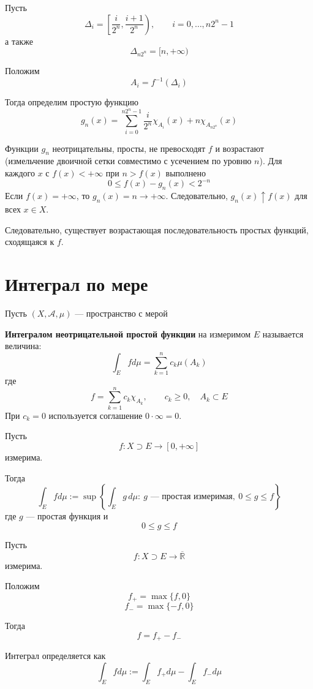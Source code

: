 \documentclass[12pt,a4paper]{article}
\begin{document}
\begin{proofbox}{}
    Пусть
    \[
        \Delta_i=\left[\frac{i}{2^n},\frac{i+1}{2^n}\right),
        \qquad i=0,\ldots,n2^n-1
    \]
    а также
    \[
        \Delta_{n2^n}=[n,+\infty)
    \]

    Положим
    \[
        A_i=f^{-1}(\Delta_i)
    \]

    Тогда определим простую функцию
    \[
        g_n(x)=
        \sum_{i=0}^{n2^n-1}
        \frac{i}{2^n}\chi_{A_i}(x)+n\chi_{A_{n2^n}}(x)
    \]

    Функции $g_n$ неотрицательны, просты, не превосходят $f$ и возрастают
    (измельчение двоичной сетки совместимо с усечением по уровню $n$).
    Для каждого $x$ с $f(x)<+\infty$ при $n>f(x)$ выполнено
    \[
        0\leq f(x)-g_n(x)<2^{-n}
    \]
    Если $f(x)=+\infty$, то $g_n(x)=n\to+\infty$.
    Следовательно, $g_n(x)\uparrow f(x)$ для всех $x\in X$.

    Следовательно, существует возрастающая последовательность простых функций, сходящаяся к $f$.
\end{proofbox}

\newpage

\section{Интеграл по мере}

Пусть $(X,\mathcal{A},\mu)$ — пространство с мерой

\begin{definition}
    \textbf{Интегралом неотрицательной простой функции} на измеримом $E$ называется величина:
    \[
        \int_E f d\mu=
        \sum_{k=1}^{n}c_k\mu(A_k)
    \]
    где
    \[
        f=\sum_{k=1}^{n}c_k\chi_{A_k},\qquad c_k\geq0,\quad A_k\subset E
    \]
    При $c_k=0$ используется соглашение $0\cdot\infty=0$.
\end{definition}

\begin{definition}
    Пусть
    \[
        f:X\supset E\to[0,+\infty]
    \]
    измерима.

    Тогда
    \[
        \int_E f d\mu
        :=
        \sup\left\{\int_E g\,d\mu:\ g\text{ --- простая измеримая},\ 0\leq g\leq f\right\}
    \]
    где $g$ — простая функция и
    \[
        0\leq g\leq f
    \]
\end{definition}

\begin{definition}
    Пусть
    \[
        f:X\supset E\to\overline{\mathbb{R}}
    \]
    измерима.

    Положим
    \[
        f_+=\max\{f,0\}
    \]
    \[
        f_-=\max\{-f,0\}
    \]

    Тогда
    \[
        f=f_+-f_-
    \]

    Интеграл определяется как
    \[
        \int_E f d\mu
        :=
        \int_E f_+ d\mu-
        \int_E f_- d\mu
    \]
\end{definition}
\end{document}
